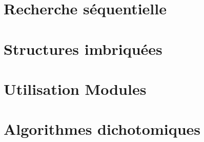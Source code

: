 \proffalse


\section*{Recherche séquentielle}
\renewcommand{\repExo}{../../Informatique/S1_Themes/01_RechercheSequentielle}

\renewcommand{\td}{01_AlgorithmesBasiques}
\graphicspath{{\repStyle/png/}{\repExo/\td/images/}}


\renewcommand{\td}{02_Dictionnaires}
\graphicspath{{\repStyle/png/}{\repExo/\td/images/}}


\renewcommand{\td}{03_SuiteSyracuse}
\graphicspath{{\repStyle/png/}{\repExo/\td/images/}}



\section*{Structures imbriquées}
\renewcommand{\repExo}{../../Informatique/S1_Themes/02_StructuresImbriquees}

\renewcommand{\td}{01_RechercheDansTexte}
\graphicspath{{\repStyle/png/}{\repExo/\td/images/}}


\renewcommand{\td}{02_TriBulles}
\graphicspath{{\repStyle/png/}{\repExo/\td/images/}}



\section*{Utilisation Modules}
\renewcommand{\repExo}{../../Informatique/S1_Themes/03_UtilisationModules}

\renewcommand{\td}{01_SurfingPorquerolles}
\graphicspath{{\repStyle/png/}{\repExo/\td/images/}}


\section*{Algorithmes dichotomiques}
\renewcommand{\repExo}{../../Informatique/S1_Themes/04_AlgorithmesDichotomiques}

\renewcommand{\td}{01_RechercheDichotomique}
\graphicspath{{\repStyle/png/}{\repExo/\td/images/}}


